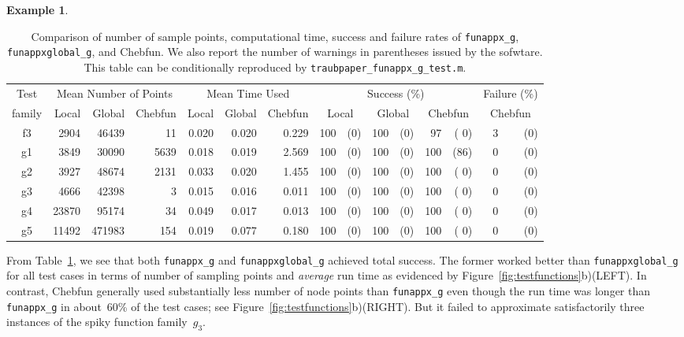 \documentclass[review]{elsarticle}
\theoremstyle{definition}
\newtheorem{exmp}{Example}
\newcommand{\funappxg}{\texttt{funappx\_g\xspace}}
\newcommand{\funappxglobalg}{\texttt{funappxglobal\_g\xspace}}
\begin{document}
\begin{exmp}
%
\begin{table}[bth]
\centering
\caption{Comparison of number of sample points, computational time, success and
failure rates of \funappxg, \funappxglobalg, and
Chebfun. We also report the number of warnings in parentheses issued by the
sofwtare. This table can be conditionally reproduced by
\texttt{traubpaper\_funappx\_g\_test.m}.}
\label{tab:localVsGlobalVsChebfun}
{\footnotesize
\setlength{\tabcolsep}{.18em} %
\begin{tabular}{|c|rrr|rrr|rrrrrr|rr|}
\hline
    Test      &     \multicolumn{3}{c|}{Mean Number of Points} & \multicolumn{3}{c|}{Mean Time Used}  & \multicolumn{6}{|c|}{Success (\%)} &  \multicolumn{2}{c|}{Failure (\%)}
\\  family &  Local  &  Global    &  Chebfun    & Local     &  Global     & Chebfun      & \multicolumn{2}{c}{Local} & \multicolumn{2}{c}{Global} & \multicolumn{2}{c}{Chebfun}  & \multicolumn{2}{|c|}{Chebfun}
\\ \hline
          f3   &   2904  &   46439   &      11    &   0.020   &     0.020    &   0.229 &    100   &  (0) &  100   &  (0) &   97   &   ( 0)   &   3   & (0)
\\        g1   &   3849  &   30090   &    5639    &   0.018   &     0.019    &   2.569 &    100   &  (0) &  100   &  (0) &  100   &   (86)   &   0   & (0)
\\        g2   &   3927  &   48674   &    2131    &   0.033   &     0.020    &   1.455 &    100   &  (0) &  100   &  (0) &  100   &   ( 0)   &   0   & (0)
\\        g3   &   4666  &   42398   &       3    &   0.015   &     0.016    &   0.011 &    100   &  (0) &  100   &  (0) &  100   &   ( 0)   &   0   & (0)
\\        g4   &  23870  &   95174   &      34    &   0.049   &     0.017    &   0.013 &    100   &  (0) &  100   &  (0) &  100   &   ( 0)   &   0   & (0)
\\        g5   &  11492  &  471983   &     154    &   0.019   &     0.077    &   0.180 &    100   &  (0) &  100   &  (0) &  100   &   ( 0)   &   0   & (0)
\\ \hline
\end{tabular}
}
\end{table}
%

From Table~\ref{tab:localVsGlobalVsChebfun}, we see that both \funappxg{} and
\funappxglobalg{} achieved total success. The former worked better than
\funappxglobalg{} for all test cases in terms of number of sampling points and
\emph{average} run time as evidenced by Figure~\ref{fig:testfunctions}b)(LEFT).
In contrast, Chebfun generally used substantially less number of node points
than \funappxg{} even though the run time was longer than \funappxg{} in
about~60\% of the test cases; see Figure~\ref{fig:testfunctions}b)(RIGHT).
But it failed to approximate satisfactorily three instances of the spiky
function family~$g_3$.



\end{exmp}
\end{document}
